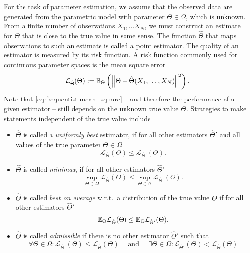 For the task of parameter estimation, we assume that the observed data are generated from the parametric model with  parameter $\Theta \in \Omega$, which is unknown.
From a finite number of observations $X_1, \ldots X_N$, we must construct an estimate for $\Theta$ that is close to the true value in some sense.
The function $\hat\Theta$ that maps observations to such an estimate is called a point estimator.
The quality of an estimator is measured by its risk function.
A risk function commonly used for continuous parameter spaces is the mean square error
\[
  \label{eq:frequentist.mean_square}
  \mathcal{L}_{\hat\Theta}(\Theta) := \mathbb{E}_\Theta \left( {\left\Vert\Theta - \hat\Theta(X_1, \ldots, X_N)\right\Vert}^2 \right).
\]
Note that \cref{eq:frequentist.mean_square} -- and therefore the performance of a given estimator -- still depends on the unknown true value $\Theta$.
Strategies to make statements independent of the true value include
\begin{definition}
  \label{def:frequentist.optimality_conditions}
  \begin{itemize}
    \item $\hat\Theta$ is called a \emph{uniformly best} estimator, if for all other estimators $\hat\Theta'$ and all values of the true parameter $\Theta \in \Omega$
    \[
      \mathcal{L}_{\hat\Theta}(\Theta) \le \mathcal{L}_{\hat\Theta'}(\Theta).
    \]

    \item $\hat\Theta$ is called \emph{minimax}, if for all other estimators $\hat\Theta'$
    \[
      \sup_{\Theta\in\Omega} \mathcal{L}_{\hat\Theta}(\Theta) \le \sup_{\Theta\in\Omega} \mathcal{L}_{\hat\Theta'}(\Theta).
    \]

    \item $\hat\Theta$ is called \emph{best on average} w.r.t.\ a distribution of the true value $\Theta$ if for all other estimators $\hat\Theta'$
    \[
      \mathbb{E}_{\Theta} \mathcal{L}_{\hat\Theta}(\Theta) \le  \mathbb{E}_{\Theta} \mathcal{L}_{\hat\Theta'}(\Theta).
    \]

    \item $\hat\Theta$ is called \emph{admissible} if there is no other estimator $\hat\Theta'$ such that
    \[
      \forall\Theta \in \Omega\colon \mathcal{L}_{\hat\Theta'}(\Theta) \le \mathcal{L}_{\hat\Theta}(\Theta)
      \quad\mbox{ and }\quad
      \exists\Theta \in \Omega\colon \mathcal{L}_{\hat\Theta'}(\Theta) < \mathcal{L}_{\hat\Theta}(\Theta)
    \]
  \end{itemize}
\end{definition}


